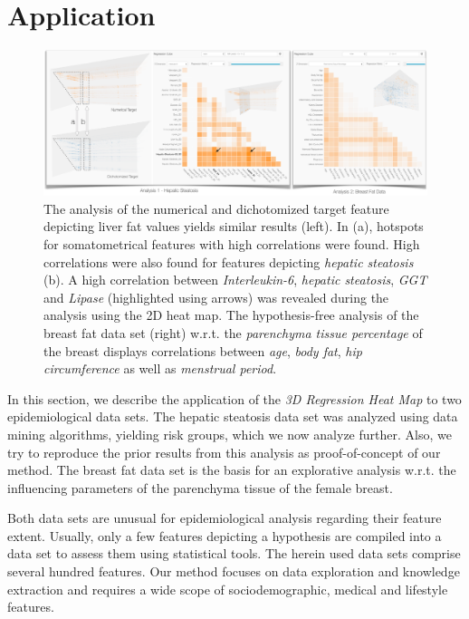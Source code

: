 \documentclass[journal]{style/vgtc} 			          %
\begin{document}
\section{Application} \label{application}
\begin{figure}[htb]
 \centering
 \includegraphics[width=1.0\linewidth]{figures/application}
 \caption{
 The analysis of the numerical and dichotomized target feature depicting liver fat values yields similar results (left).
 In (a), hotspots for somatometrical features with high correlations were found.
 High correlations were also found for features depicting \emph{hepatic steatosis} (b).
 A high correlation between \emph{Interleukin-6}, \emph{hepatic steatosis}, \emph{GGT} and \emph{Lipase} (highlighted using arrows) was revealed during the analysis using the 2D heat map.
 The hypothesis-free analysis of the breast fat data set (right) w.r.t. the \emph{parenchyma tissue percentage} of the breast displays correlations between \emph{age}, \emph{body fat}, \emph{hip circumference} as well as \emph{menstrual period}.
 }
  \label{fig:Application}
\end{figure}
In this section, we describe the application of the \emph{3D Regression Heat Map} to two epidemiological data sets.
The hepatic steatosis data set was analyzed using data mining algorithms, yielding risk groups, which we now analyze further.
Also, we try to reproduce the prior results from this analysis as proof-of-concept of our method.
The breast fat data set is the basis for an explorative analysis w.r.t. the influencing parameters of the parenchyma tissue of the female breast.

Both data sets are unusual for epidemiological analysis regarding their feature extent.
Usually, only a few features depicting a hypothesis are compiled into a data set to assess them using statistical tools.
The herein used data sets comprise several hundred features.
Our method focuses on data exploration and knowledge extraction and requires a wide scope of sociodemographic, medical and lifestyle features.
\end{document}
